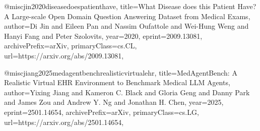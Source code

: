 @misc{jin2020diseasedoespatienthave,
      title={What Disease does this Patient Have? A Large-scale Open Domain Question Answering Dataset from Medical Exams}, 
      author={Di Jin and Eileen Pan and Nassim Oufattole and Wei-Hung Weng and Hanyi Fang and Peter Szolovits},
      year={2020},
      eprint={2009.13081},
      archivePrefix={arXiv},
      primaryClass={cs.CL},
      url={https://arxiv.org/abs/2009.13081}, 
}

@misc{jiang2025medagentbenchrealisticvirtualehr,
      title={MedAgentBench: A Realistic Virtual EHR Environment to Benchmark Medical LLM Agents}, 
      author={Yixing Jiang and Kameron C. Black and Gloria Geng and Danny Park and James Zou and Andrew Y. Ng and Jonathan H. Chen},
      year={2025},
      eprint={2501.14654},
      archivePrefix={arXiv},
      primaryClass={cs.LG},
      url={https://arxiv.org/abs/2501.14654}, 
}